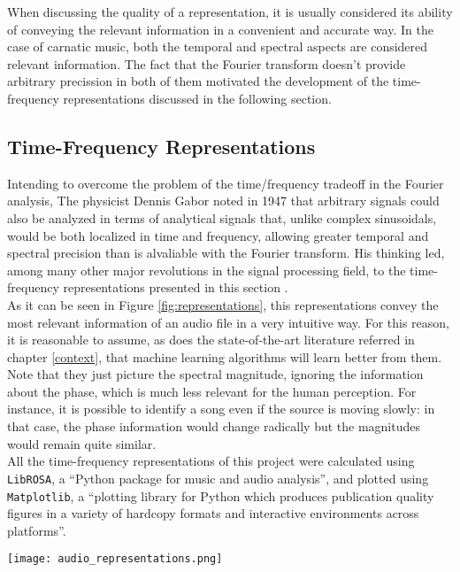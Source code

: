   When discussing the quality of a representation, it is usually considered its ability of conveying the relevant information in a convenient and accurate way. In the case of carnatic music, both the temporal and spectral aspects are considered relevant information. The fact that the Fourier transform doesn't provide arbitrary precission in both of them motivated the development of the time-frequency representations discussed in the following section.

  \subsection{Time-Frequency Representations} \label{timefreqrepr}

  Intending to overcome the problem of the time/frequency tradeoff in the Fourier analysis, The physicist Dennis Gabor noted in 1947 that arbitrary signals could also be analyzed in terms of analytical signals that, unlike complex sinusoidals, would be both localized in time and frequency, allowing greater temporal and spectral precision than is alvaliable with the Fourier transform. His thinking led, among many other major revolutions in the signal processing field, to the time-frequency representations presented in this section \cite[p.454-458]{musimathics}.\\

  As it can be seen in Figure \ref{fig:representations}, this representations convey the most relevant information of an audio file in a very intuitive way. For this reason, it is reasonable to assume, as does the state-of-the-art literature referred in chapter \ref{context}, that machine learning algorithms will learn better from them. Note that they just picture the spectral magnitude, ignoring the information about the phase, which is much less relevant for the human perception. For instance, it is possible to identify a song even if the source is moving slowly: in that case, the phase information would change radically but the magnitudes would remain quite similar.\\

  All the time-frequency representations of this project were calculated using \texttt{LibROSA}, a ``Python package for music and audio analysis''\cite{librosa}, and plotted using \texttt{Matplotlib}, a ``plotting library for Python which produces publication quality figures in a variety of hardcopy formats and interactive environments across platforms''\cite{matplotlib}.


  \begin{sidewaysfigure}%
    \centering
    \texttt{[image: audio\_representations.png]}
    \caption{Different Time-Frequency representations of the same fragment of carnatic music. In it, a t\=anpura plays a drone, while a flute plays a melody, responded by a violin in seconds 16 and 18.}
    \label{fig:representations}
  \end{sidewaysfigure}


